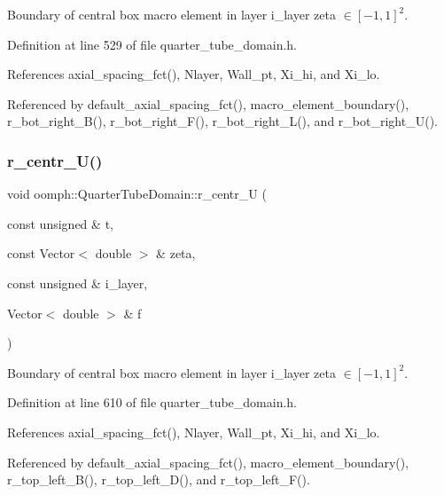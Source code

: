 Boundary of central box macro element in layer i\+\_\+layer zeta $ \in [-1,1]^2 $. 



Definition at line 529 of file quarter\+\_\+tube\+\_\+domain.\+h.



References axial\+\_\+spacing\+\_\+fct(), Nlayer, Wall\+\_\+pt, Xi\+\_\+hi, and Xi\+\_\+lo.



Referenced by default\+\_\+axial\+\_\+spacing\+\_\+fct(), macro\+\_\+element\+\_\+boundary(), r\+\_\+bot\+\_\+right\+\_\+\+B(), r\+\_\+bot\+\_\+right\+\_\+\+F(), r\+\_\+bot\+\_\+right\+\_\+\+L(), and r\+\_\+bot\+\_\+right\+\_\+\+U().

\mbox{\label{classoomph_1_1QuarterTubeDomain_afb2013af63e8207676102ee16d856dca}} 
\subsubsection{\texorpdfstring{r\+\_\+centr\+\_\+\+U()}{r\_centr\_U()}}
{\footnotesize\ttfamily void oomph\+::\+Quarter\+Tube\+Domain\+::r\+\_\+centr\+\_\+U (\begin{DoxyParamCaption}\item[{const unsigned \&}]{t,  }\item[{const Vector$<$ double $>$ \&}]{zeta,  }\item[{const unsigned \&}]{i\+\_\+layer,  }\item[{Vector$<$ double $>$ \&}]{f }\end{DoxyParamCaption})\hspace{0.3cm}{\ttfamily [private]}}



Boundary of central box macro element in layer i\+\_\+layer zeta $ \in [-1,1]^2 $. 



Definition at line 610 of file quarter\+\_\+tube\+\_\+domain.\+h.



References axial\+\_\+spacing\+\_\+fct(), Nlayer, Wall\+\_\+pt, Xi\+\_\+hi, and Xi\+\_\+lo.



Referenced by default\+\_\+axial\+\_\+spacing\+\_\+fct(), macro\+\_\+element\+\_\+boundary(), r\+\_\+top\+\_\+left\+\_\+\+B(), r\+\_\+top\+\_\+left\+\_\+\+D(), and r\+\_\+top\+\_\+left\+\_\+\+F().

